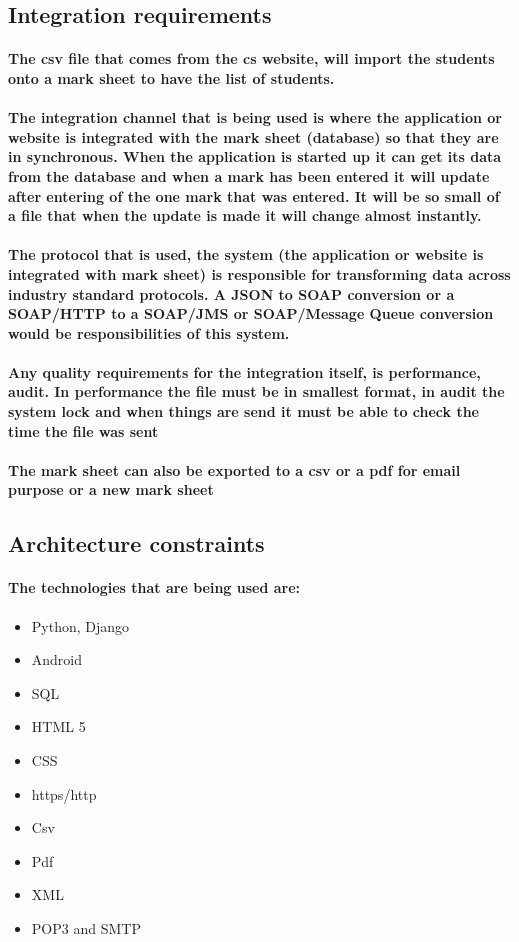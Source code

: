 \documentclass[12pt]{article}
\begin{document}
  \subsection{Integration requirements}
  \paragraph{
  The csv file that comes from the cs website, will import the students onto a mark sheet to have the list of students.
  }
  \paragraph{
  The integration channel that is being used is where the application or website is integrated with the mark sheet (database) so that they are in synchronous. When the application is started up it can get its data from the database and when a mark has been entered it will update after entering of the one mark that was entered. It will be so small of a file that when the update is made it will change almost instantly.
  }
  \paragraph{
  The protocol that is used, the system (the application or website is integrated with mark sheet) is responsible for transforming data across industry standard protocols. A JSON to SOAP conversion or a SOAP/HTTP to a SOAP/JMS or SOAP/Message Queue conversion would be responsibilities of this system. 
  }
  \paragraph{
  Any quality requirements for the integration itself, is performance, audit. In performance the file must be in smallest format, in audit the system lock and when things are send it must be able to check the time the file was sent
  }
  \paragraph{
  The mark sheet can also be exported to a csv or a pdf for email purpose or a new mark sheet
  }
  \subsection{Architecture constraints}
  \paragraph{
  The technologies that are being used are:
  }
  \begin{itemize}
  \item Python, Django
  \item Android
  \item SQL
  \item HTML 5
  \item CSS
  \item https/http
  \item Csv
  \item Pdf
  \item XML
  \item POP3 and SMTP
\end{itemize}
\end{document}
